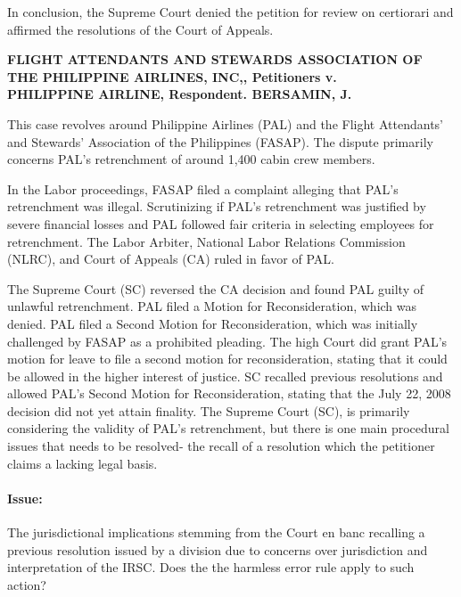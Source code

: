 \documentclass[
12pt,
oneside,
onehalfspacing,
headsepline
]{DigestCollection}
\begin{document}
In conclusion, the Supreme Court denied the petition for review on certiorari and affirmed the resolutions of the Court of Appeals.

\label{3ba03860-0a1d-11ef-932c-63c852f65e48}


\noindent\textbf{FLIGHT ATTENDANTS AND STEWARDS ASSOCIATION OF THE PHILIPPINE AIRLINES, INC,, Petitioners v. \\PHILIPPINE AIRLINE, Respondent. BERSAMIN, J.}\vspace{0.4cm}

This case revolves around Philippine Airlines (PAL) and the Flight Attendants' and Stewards' Association of the Philippines (FASAP). The dispute primarily concerns PAL's retrenchment of around 1,400 cabin crew members.

In the Labor proceedings, FASAP filed a complaint alleging that PAL's retrenchment was illegal. Scrutinizing if PAL's retrenchment was justified by severe financial losses and PAL followed fair criteria in selecting employees for retrenchment. The Labor Arbiter, National Labor Relations Commission (NLRC), and Court of Appeals (CA) ruled in favor of PAL.

The Supreme Court (SC) reversed the CA decision and found PAL guilty of unlawful retrenchment. PAL filed a Motion for Reconsideration, which was denied. PAL filed a Second Motion for Reconsideration, which was initially challenged by FASAP as a prohibited pleading. The high Court did grant PAL's motion for leave to file a second motion for reconsideration, stating that it could be allowed in the higher interest of justice. SC recalled previous resolutions and allowed PAL's Second Motion for Reconsideration, stating that the July 22, 2008 decision did not yet attain finality. The Supreme Court (SC), is primarily considering the validity of PAL's retrenchment, but there is one main procedural issues that needs to be resolved- the recall of a resolution which the petitioner claims a lacking legal basis.

\paragraph{Issue:}
\label{7eb66ab0-125c-11ef-aa24-9916ea601717}


The jurisdictional implications stemming from the Court en banc recalling a previous resolution issued by a division due to concerns over jurisdiction and interpretation of the IRSC. Does the the harmless error rule apply to such action?
\end{document}
